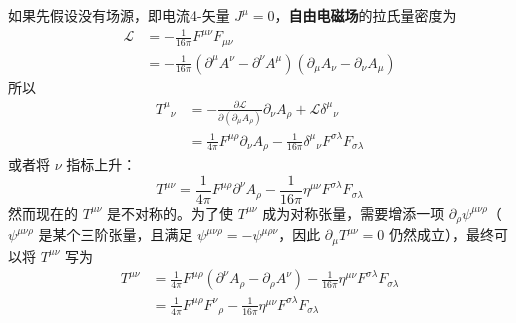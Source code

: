 如果先假设没有场源，即电流4-矢量 $J^\mu = 0$，\textbf{自由电磁场}的拉氏量密度为
\begin{equation}
\begin{aligned}
\mathcal{L}&=-\frac{1}{16\pi}F^{\mu\nu} F_{\mu\nu}\\
&=-\frac{1}{16\pi}(\partial^\mu A^\nu-\partial^\nu A^\mu)(\partial_\mu A_\nu-\partial_\nu A_\mu)
\end{aligned}
\end{equation}
所以
\begin{equation}
\begin{aligned}
T^\mu{}_\nu&=-\frac{\partial \mathcal{L}}{\partial (\partial_\mu A_\rho)}\partial_\nu A_\rho+\mathcal{L}\delta^\mu{}_\nu\\
&=\frac{1}{4\pi}F^{\mu\rho}\partial_\nu A_\rho-\frac{1}{16\pi}\delta^\mu{}_\nu F^{\sigma\lambda}F_{\sigma\lambda}
\end{aligned}
\end{equation}
或者将 $\nu$ 指标上升：
\begin{equation}
T^{\mu\nu}=\frac{1}{4\pi}F^{\mu\rho}\partial^\nu A_\rho - \frac{1}{16\pi} \eta^{\mu\nu}F^{\sigma\lambda}F_{\sigma\lambda}
\end{equation}
然而现在的 $T^{\mu\nu}$ 是不对称的。为了使 $T^{\mu\nu}$ 成为对称张量，需要增添一项 $\partial_\rho \psi^{\mu\nu\rho}$（$\psi^{\mu\nu\rho}$ 是某个三阶张量，且满足 $\psi^{\mu\nu\rho}=-\psi^{\mu\rho\nu}$，因此 $\partial_\mu T^{\mu\nu}=0$ 仍然成立），最终可以将 $T^{\mu\nu}$ 写为
\begin{equation}
\begin{aligned}
T^{\mu\nu}&=\frac{1}{4\pi}F^{\mu\rho}(\partial^\nu A_\rho-\partial_\rho A^\nu) - \frac{1}{16\pi} \eta^{\mu\nu}F^{\sigma\lambda}F_{\sigma\lambda}\\
&=\frac{1}{4\pi}F^{\mu\rho}F^\nu{}_\rho - \frac{1}{16\pi} \eta^{\mu\nu}F^{\sigma\lambda}F_{\sigma\lambda}
\end{aligned}
\end{equation}

